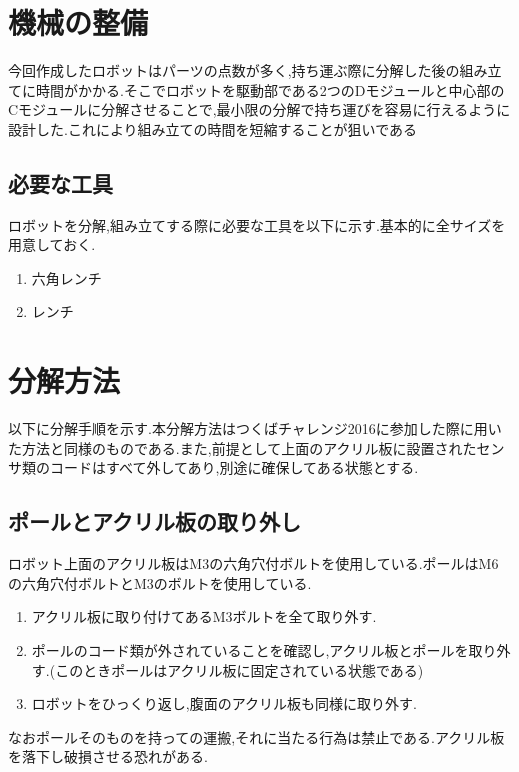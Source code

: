 \mc
\section{機械の整備}
今回作成したロボットはパーツの点数が多く,持ち運ぶ際に分解した後の組み立てに時間がかかる.そこでロボットを駆動部である2つのDモジュールと中心部のCモジュールに分解させることで,最小限の分解で持ち運びを容易に行えるように設計した.これにより組み立ての時間を短縮することが狙いである
\subsection{必要な工具}
ロボットを分解,組み立てする際に必要な工具を以下に示す.基本的に全サイズを用意しておく.
\begin{enumerate}
 \item 六角レンチ
 \item レンチ
\end{enumerate}

\section{分解方法}
以下に分解手順を示す.本分解方法はつくばチャレンジ2016に参加した際に用いた方法と同様のものである.また,前提として上面のアクリル板に設置されたセンサ類のコードはすべて外してあり,別途に確保してある状態とする.

\subsection{ポールとアクリル板の取り外し}
ロボット上面のアクリル板はM3の六角穴付ボルトを使用している.ポールはM6の六角穴付ボルトとM3のボルトを使用している.

\begin{enumerate}
 \item アクリル板に取り付けてあるM3ボルトを全て取り外す.
 \item ポールのコード類が外されていることを確認し,アクリル板とポールを取り外す.(このときポールはアクリル板に固定されている状態である)
 \item ロボットをひっくり返し,腹面のアクリル板も同様に取り外す.
\end{enumerate}
なおポールそのものを持っての運搬,それに当たる行為は禁止である.アクリル板を落下し破損させる恐れがある.

